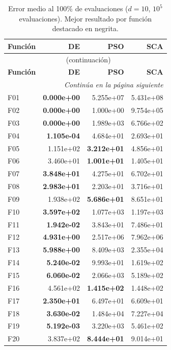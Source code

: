 \documentclass[12pt,a4paper]{article}
\begin{document}
\begin{longtable}{lrrr}
\caption{Error medio al 100\% de evaluaciones ($d=10$, $10^5$ evaluaciones). Mejor resultado por función destacado en negrita.}
\label{tab:resultados_final_d10}\\
\toprule
\textbf{Función} & \textbf{DE} & \textbf{PSO} & \textbf{SCA} \\
\midrule
\endfirsthead
\multicolumn{4}{c}{\tablename~\thetable{} (continuación)}\\
\toprule
\textbf{Función} & \textbf{DE} & \textbf{PSO} & \textbf{SCA} \\
\midrule
\endhead
\midrule
\multicolumn{4}{r}{\textit{Continúa en la página siguiente}}\\
\endfoot
\bottomrule
\endlastfoot
F01  & \textbf{0.000e+00} & 5.255e+07 & 5.431e+08 \\
F02  & \textbf{0.000e+00} & 1.000e+00 & 9.754e+05 \\
F03  & \textbf{0.000e+00} & 1.989e+03 & 6.766e+02 \\
F04  & \textbf{1.105e-04} & 4.684e+01 & 2.693e+01 \\
F05  & 1.151e+02 & \textbf{3.212e+01} & 4.856e+01 \\
F06  & 3.460e+01 & \textbf{1.001e+01} & 1.405e+01 \\
F07  & \textbf{3.848e+01} & 4.275e+01 & 6.702e+01 \\
F08  & \textbf{2.983e+01} & 2.203e+01 & 3.716e+01 \\
F09  & 1.938e+02 & \textbf{5.686e+01} & 8.651e+01 \\
F10  & \textbf{3.597e+02} & 1.077e+03 & 1.197e+03 \\
F11  & \textbf{1.942e-02} & 3.843e+01 & 7.486e+01 \\
F12  & \textbf{4.931e+00} & 2.517e+06 & 7.962e+06 \\
F13  & \textbf{5.988e+00} & 8.409e+03 & 2.355e+04 \\
F14  & \textbf{5.240e-02} & 9.993e+01 & 1.619e+02 \\
F15  & \textbf{6.060e-02} & 2.066e+03 & 5.189e+02 \\
F16  & 4.561e+02 & \textbf{1.415e+02} & 1.448e+02 \\
F17  & \textbf{2.350e+01} & 6.497e+01 & 6.609e+01 \\
F18  & \textbf{3.630e-02} & 1.484e+04 & 7.227e+04 \\
F19  & \textbf{5.192e-03} & 3.220e+03 & 5.461e+02 \\
F20  & 3.837e+02 & \textbf{8.444e+01} & 9.014e+01 \\

\end{longtable}
\end{document}
